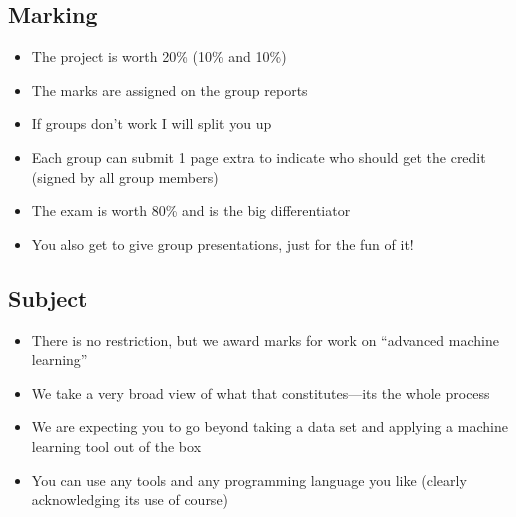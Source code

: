 
\begin{slide}
\section{Marking}

\begin{PauseHighLight}
  \begin{itemize}
  \item The project is worth 20\% (10\% and 10\%)\pause
  \item The marks are assigned on the group reports\pause
  \item If groups don't work I will split you up\pause
  \item Each group can submit 1 page extra to indicate who should get the
    credit (signed by all group members)\pause
  \item The exam is worth 80\% and is the big differentiator\pause
  \item You also get to give group presentations, just for the fun of it!\pauseb
  \end{itemize}
\end{PauseHighLight}

\end{slide}


\Outline %

\begin{slide}
\section{Subject}

\begin{PauseHighLight}
  \begin{itemize}
  \item There is no restriction, but we award marks for work on
    ``advanced machine learning''\pause
  \item We take a very broad view of what that constitutes---its the
    whole process\pause
  \item We are expecting you to go beyond taking a data set and applying
    a machine learning tool out of the box\pause
  \item You can use any tools and any programming language you like
    (clearly acknowledging its use of course)\pause
  \end{itemize}
\end{PauseHighLight}

\end{slide}

